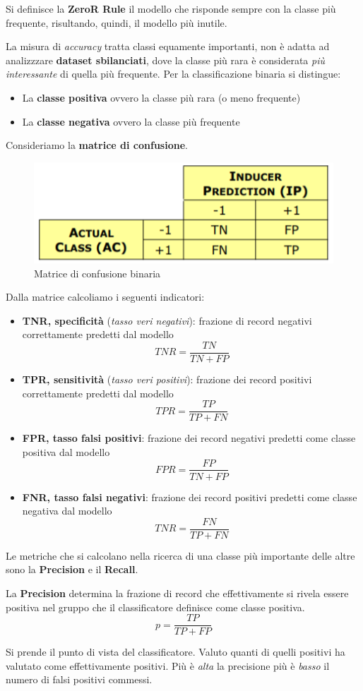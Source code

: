 \begin{defn}
	Si definisce la \textbf{ZeroR Rule}	il modello che risponde sempre con la classe più frequente, risultando, quindi, il modello più inutile.	
\end{defn}
La misura di \textit{accuracy} tratta classi equamente importanti, non è adatta ad analizzzare \textbf{dataset sbilanciati},  dove la classe più rara è considerata \textit{più interessante} di quella più frequente. Per la classificazione binaria si distingue:
\begin{itemize}
	\item La \textbf{classe positiva} ovvero la classe più rara (o meno frequente)
	\item La \textbf{classe negativa} ovvero la classe più frequente
\end{itemize}
Consideriamo la \textbf{matrice di confusione}.
\begin{figure}[H]
	\centering
	\includegraphics[height=0.25 \linewidth]{classification/pict/matrconf.png}
	\caption{Matrice di confusione binaria}
\end{figure}
Dalla matrice calcoliamo i seguenti indicatori:
\begin{itemize}
	\item 		\textbf{TNR, specificità} (\textit{tasso veri negativi}):  frazione di record negativi correttamente predetti dal modello  \[TNR = \frac{TN}{TN + FP}\]
	\item	\textbf{TPR, sensitività} (\textit{tasso veri positivi}): frazione dei record positivi correttamente predetti dal modello \[TPR = \frac{TP}{TP + FN}\]
	\item \textbf{FPR, tasso falsi positivi}: frazione dei record negativi predetti come classe positiva dal modello \[FPR = \frac{FP}{TN + FP}\]
	\item \textbf{FNR, tasso falsi negativi}: frazione dei record positivi predetti come classe negativa dal modello \[TNR = \frac{FN}{TP + FN}\]
\end{itemize}
Le metriche che si calcolano nella ricerca di una classe più importante delle altre sono la \textbf{Precision} e il \textbf{Recall}.
\begin{defn}
	La \textbf{Precision} determina la frazione di record che effettivamente si rivela essere positiva nel gruppo che il classificatore definisce come classe positiva. 
	\[p = \frac{TP}{TP+FP}\]
\end{defn}
Si prende il punto di vista del classificatore. Valuto quanti di quelli positivi ha valutato come effettivamente positivi. Più è \textit{alta}  la precisione più è \textit{basso} il numero di falsi positivi commessi.

